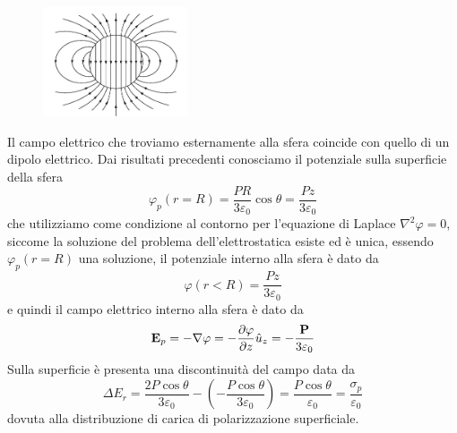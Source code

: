 \begin{figure} %
    \centering
    \includegraphics[width=0.38\textwidth]{images/dielpolarized} %
\end{figure}
Il campo elettrico che troviamo esternamente alla sfera coincide con quello di un dipolo elettrico. Dai risultati precedenti conosciamo il potenziale sulla superficie della sfera
\begin{equation*}
	\varphi_{p}(r =R) = \frac{PR}{3 \varepsilon_0} \cos \theta = \frac{Pz}{3 \varepsilon_0}
\end{equation*}
che utilizziamo come condizione al contorno per l'equazione di Laplace $\nabla^2 \varphi = 0 $, siccome la soluzione del problema dell'elettrostatica esiste ed \`e unica, essendo $\varphi_{p}(r=R)$ una soluzione, il potenziale interno alla sfera \`e dato da 
\begin{equation*}
	\varphi(r < R) = \frac{Pz}{3 \varepsilon_0}
\end{equation*}
e quindi il campo elettrico interno alla sfera \`e dato da 
\begin{equation}
	\bold{E}_{p} = - \nabla \varphi = - \frac{\partial \varphi}{\partial z} \hat{u}_{z} = - \frac{\bold{P}}{3 \varepsilon_0}
\end{equation}
Sulla superficie \`e presenta una discontinuit\`a del campo data da
\begin{equation*}
	\Delta E_{r} = \frac{2P \cos \theta}{3 \varepsilon_0} - \left(- \frac{P \cos \theta}{3 \varepsilon_0}\right)=  \frac{P \cos \theta}{\varepsilon_0} =\frac{\sigma_{p}}{\varepsilon_0}
\end{equation*}
dovuta alla distribuzione di carica di polarizzazione superficiale.

